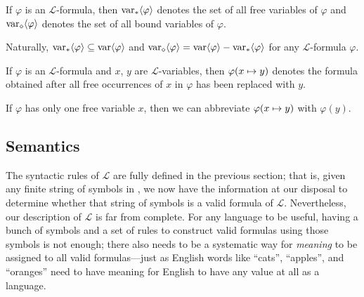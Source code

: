 \begin{dfn}
     \label{dfn:first-order-language-the-set-of-all-free-variables-bound-variables-of-a-formula}
    If \( \varphi \) is an \( \mathcal{L} \)-formula, then \( \operatorname{var}_{\ast} \langle\varphi\rangle \) denotes the set of all free variables of \( \varphi \) and
    \( \operatorname{var}_{\diamond} \langle\varphi\rangle \) denotes the set of all bound variables of \( \varphi \).
\end{dfn}

\begin{cor}
     \label{cor:first-order-language-set-of-all-free-variables-is-a-subset-of-set-of-all-variables-the-definition-of-the-set-of-all-bound-variables}
    Naturally, \( \operatorname{var}_{\ast} \langle\varphi\rangle \subseteq \operatorname{var} \langle\varphi\rangle \) and \( \operatorname{var}_{\diamond} \langle\varphi\rangle = \operatorname{var} \langle\varphi\rangle - \operatorname{var}_{\ast} \langle\varphi\rangle \)
    for any \( \mathcal{L} \)-formula \( \varphi \).
\end{cor}

\begin{dfn}
     \label{dfn:first-order-language-free-variable-replacement-in-formulas}
    If \( \varphi \) is an \( \mathcal{L} \)-formula and \( x \), \( y \) are \( \mathcal{L} \)-variables,
    then \( \folfreevariablereplacement{\varphi}{x}{y} \) denotes the formula obtained after all free occurrences of \( x \) in \( \varphi \) has been
    replaced with \( y \).
\end{dfn}

\begin{notation}
    If \( \varphi \) has only one free variable \( x \), then we can abbreviate \( \folfreevariablereplacement{\varphi}{x}{y} \) with \( \varphi(y) \).
\end{notation}

\subsection{Semantics}
\noindent
The syntactic rules of \( \mathcal{L} \) are fully defined in the previous section;
that is, given any finite string of symbols in , we
now have the information at our disposal to determine whether that string of symbols is a valid formula of \( \mathcal{L} \).
Nevertheless, our description of \( \mathcal{L} \) is far from complete. For any language to be useful, having a bunch of symbols
and a set of rules to construct valid formulas using those symbols is not enough; there also needs to be a systematic way for
\emph{meaning} to be assigned to all valid formulas---just as English words like ``cats'', ``apples'', and ``oranges'' need to have meaning
for English to have any value at all as a language.

